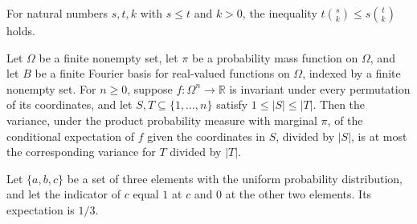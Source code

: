 \begin{theorem}
\label{FABL.mul_choose_le_mul_choose_of_le}
\leanok
{}
For natural numbers $s,t,k$ with $s\le t$ and $k>0$, the inequality $t\binom{s}{k}\le
s\binom{t}{k}$ holds.
\end{theorem}

\begin{theorem}
\label{FABL.FiniteFourierBasis.normalized_projectedVariance_mono_of_symmetric}
\leanok
{}
Let $\Omega$ be a finite nonempty set, let $\pi$ be a probability mass function on
$\Omega$, and let $B$ be a finite Fourier basis for real-valued functions on $\Omega$,
indexed by a finite nonempty set. For $n\ge 0$, suppose $f:\Omega^n\to\mathbb{R}$ is
invariant under every permutation of its coordinates, and let
$S,T\subseteq\{1,\ldots,n\}$ satisfy $1\le |S|\le |T|$. Then the variance, under the
product probability measure with marginal $\pi$, of the conditional expectation of $f$
given the coordinates in $S$, divided by $|S|$, is at most the corresponding variance
for $T$ divided by $|T|$.
\end{theorem}

\begin{theorem}
\label{FABL.pmfExpectation_threePointCIndicator}
\leanok
{}
Let $\{a,b,c\}$ be a set of three elements with the uniform probability distribution,
and let the indicator of $c$ equal $1$ at $c$ and $0$ at the other two elements. Its
expectation is $1/3$.
\end{theorem}

